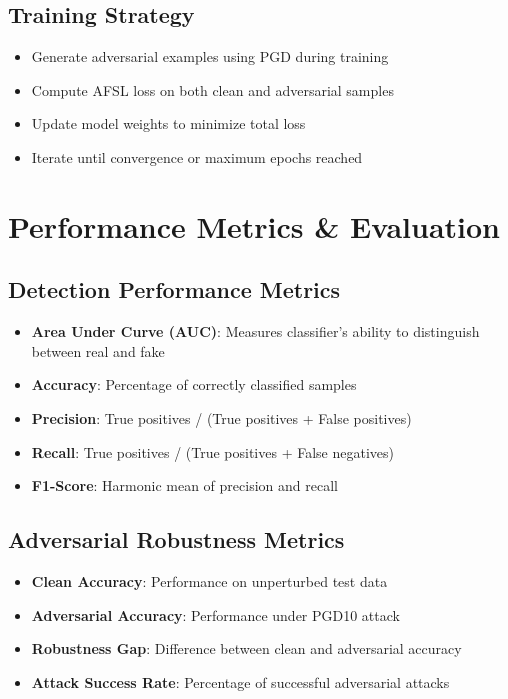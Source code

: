 \documentclass[a4paper,12pt]{article}
\begin{document}
\subsection{Training Strategy}
\begin{itemize}
    \item Generate adversarial examples using PGD during training
    \item Compute AFSL loss on both clean and adversarial samples
    \item Update model weights to minimize total loss
    \item Iterate until convergence or maximum epochs reached
\end{itemize}

\newpage
\section{Performance Metrics \& Evaluation}

\subsection{Detection Performance Metrics}
\begin{itemize}
    \item \textbf{Area Under Curve (AUC)}: Measures classifier's ability to distinguish between real and fake
    \item \textbf{Accuracy}: Percentage of correctly classified samples
    \item \textbf{Precision}: True positives / (True positives + False positives)
    \item \textbf{Recall}: True positives / (True positives + False negatives)
    \item \textbf{F1-Score}: Harmonic mean of precision and recall
\end{itemize}

\subsection{Adversarial Robustness Metrics}
\begin{itemize}
    \item \textbf{Clean Accuracy}: Performance on unperturbed test data
    \item \textbf{Adversarial Accuracy}: Performance under PGD10 attack
    \item \textbf{Robustness Gap}: Difference between clean and adversarial accuracy
    \item \textbf{Attack Success Rate}: Percentage of successful adversarial attacks
\end{itemize}
\end{document}
